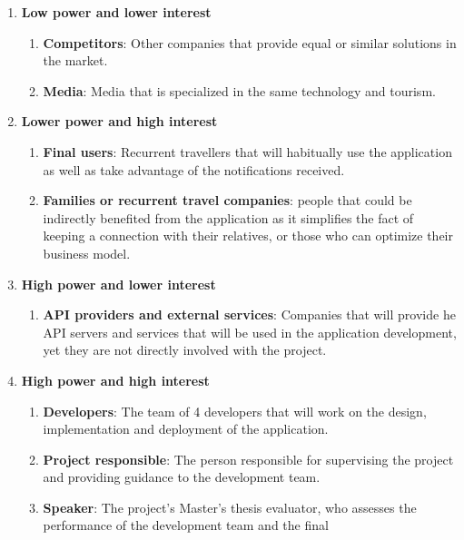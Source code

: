 \documentclass[../memory.tex]{subfiles}
\begin{document}
\begin{enumerate}[label = -]
	\item \textbf{Low power and lower interest}
	      \begin{enumerate}[label = -]
		      \item \textbf{Competitors}: Other companies that provide equal or
		            similar solutions in the market.
		      \item \textbf{Media}: Media that is specialized in the same technology
		            and tourism.
	      \end{enumerate}
	\item \textbf{Lower power and high interest}
	      \begin{enumerate}[label = -]
		      \item \textbf{Final users}: Recurrent travellers that will habitually
		            use the application as well as take advantage of the
		            notifications received.
		      \item \textbf{Families or recurrent travel companies}: people that
		            could be indirectly benefited from the application as it
		            simplifies the fact of keeping a connection with their
		            relatives, or those who can optimize their business model.
	      \end{enumerate}
	\item \textbf{High power and lower interest}
	      \begin{enumerate}[label = -]
		      \item \textbf{API providers and external services}: Companies that
		            will provide he API servers and services that will be used
		            in the application development, yet they are not directly
		            involved with the project.
	      \end{enumerate}
	\item \textbf{High power and high interest}
	      \begin{enumerate}[label = -]
		      \item \textbf{Developers}: The team of 4 developers that will work on
		            the design, implementation and deployment of the application.
		      \item \textbf{Project responsible}: The person responsible for
		            supervising the project and providing guidance to the
		            development team.
		      \item \textbf{Speaker}: The project's Master's thesis evaluator, who
		            assesses the performance of the development team and the final

\end{enumerate}
\end{enumerate}
\end{document}
